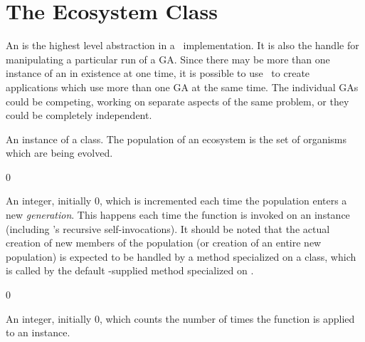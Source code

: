 \section{The Ecosystem Class}

An  is the highest level abstraction in a \geco\ implementation.
It is also the handle for manipulating a particular run of a GA. Since there may be
more than one instance of an  in existence at one time, it is
possible to use \geco\ to create applications which use more than one GA at the same
time. The individual GAs could be competing, working on separate aspects of the same
problem, or they could be completely independent.
\filbreak
{\samepage


\gap
{}


  An instance of a  class.
  The population of an ecosystem is the set of organisms which are being 
  evolved.
\par}%

\filbreak

{\samepage
   {0}

  An integer, initially 0, which is 
  incremented each time the population enters a new {\em generation}.
  This happens each time the 
  function is invoked on an  instance (including
  's recursive self-invocations). It should be noted
  that the actual creation of new members of the population (or creation
  of an entire new population) is expected to be handled by a 
  method specialized on a  class, which
  is called by the default \geco-supplied  method 
  specialized on .
\par}%

\filbreak

{\samepage
   {0}

  An integer, initially 0, which counts the number of times the 
   function is applied to an  instance.
\par}%

\filbreak

